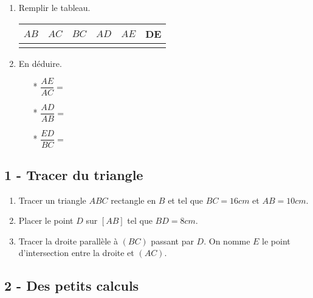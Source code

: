 \documentclass[11pt]{article}
\begin{document}
\begin{enumerate}

\item Remplir le tableau.
  \begin{center}
    \begin{tabular}{| c | c | c | c | c | c |}
      \hline
      $AB$    & $AC$ & $BC$ & $AD$ & $AE$  & DE \\
      \hline
      \phantom{1234567890} & \phantom{1234567890} & \phantom{1234567890} & \phantom{1234567890} & \phantom{1234567890} &  \phantom{1234567890} \\
      \hline
    \end{tabular}
  \end{center}

\item En déduire.
  \begin{multicols}{3}
    \begin{itemize}
    \item[*] $\dfrac{AE}{AC} = $
    \item[*] $\dfrac{AD}{AB} = $
    \item[*] $\dfrac{ED}{BC} = $
    \end{itemize}
  \end{multicols}
\end{enumerate}

\subsection*{1 - Tracer du triangle}

\begin{enumerate}
\item Tracer un triangle $ABC$ rectangle en $B$ et tel que $BC = 16cm$ et $AB = 10cm$.
\item Placer le point $D$ sur $[AB]$ tel que $BD = 8cm$.
\item Tracer la droite parallèle à $(BC)$ passant par $D$. On nomme $E$ le point d'intersection entre la droite et $(AC)$.
\end{enumerate}

\subsection*{2 - Des petits calculs}
\end{document}
